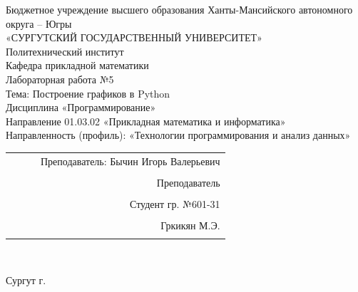 \documentclass[a4paper]{article}
\begin{document}
\thispagestyle{empty}
\begin{center}

\large{Бюджетное учреждение высшего образования Ханты-Мансийского автономного округа – Югры}\\
\large{«СУРГУТСКИЙ ГОСУДАРСТВЕННЫЙ УНИВЕРСИТЕТ»}\\

\hfill \break
\normalsize{Политехнический институт}\\
 \hfill \break
\normalsize{Кафедра прикладной математики}\\
\hfill\break
\hfill \break
\hfill \break
\hfill \break
\large{Лабораторная работа №5}\\
\normalsize{Тема: Построение графиков в Python}\\
\hfill \break
\hfill \break
\hfill \break
\hfill \break
Дисциплина «Программирование»\\
\hfill \break
\small{Направление 01.03.02 «Прикладная математика и информатика»\\
Направленность (профиль): «Технологии программирования и анализ данных»}\\
\end{center}

\hfill \break
\hfill \break
\hfill \break
\hfill \break
\hfill \break
\hfill \break

\begin{flushright}
\normalsize{ 
\begin{tabular}{ccrr}
 & & & Преподаватель: Бычин Игорь Валерьевич \\\\
 & & & Преподаватель \\\\
 & & & Студент гр. №601-31 \\\\
 & & & Гркикян М.Э. \\\\
\end{tabular}
}\\
\end{flushright}

\hfill \break
\hfill \break
\begin{center} Сургут \the\year{} г.  \end{center}
\end{document}
